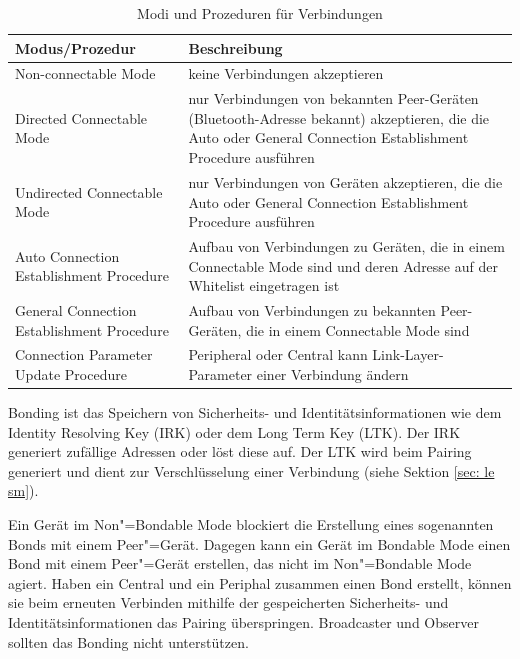 \begin{table}
    \begin{tabularx}{\textwidth}{|p{4.5cm}|X|}
    \hline
    \textbf{Modus/Prozedur} & \textbf{Beschreibung} \\
    \hline
    Non-connectable Mode & keine Verbindungen akzeptieren \\
    \hline
    Directed Connectable Mode & nur Verbindungen von bekannten Peer-Geräten (Bluetooth-Adresse bekannt) akzeptieren, die die Auto oder General Connection Establishment Procedure ausführen \\
    \hline
    Undirected Connectable Mode & nur Verbindungen von Geräten akzeptieren, die die Auto oder General Connection Establishment Procedure ausführen \\
    \hline
    Auto Connection Establishment Procedure & Aufbau von Verbindungen zu Geräten, die in einem Connectable Mode sind und deren Adresse auf der Whitelist eingetragen ist \\
    \hline
    General Connection Establishment Procedure & Aufbau von Verbindungen zu bekannten Peer-Geräten, die in einem Connectable Mode sind \\
    \hline
    Connection Parameter Update Procedure & Peripheral oder Central kann Link-Layer-Parameter einer Verbindung ändern \\
    \hline
    \end{tabularx}
    \caption[Modi und Prozeduren für Verbindungen (GAP)]{Modi und Prozeduren für Verbindungen \cite{BtSpec4.0_1704-1718}}
    \label{tab: modi prodzeduren gap}
\end{table}

Bonding ist das Speichern von Sicherheits- und Identitätsinformationen wie dem Identity Resolving Key (IRK) oder dem Long Term Key (LTK). Der IRK generiert zufällige Adressen oder löst diese auf. Der LTK wird beim Pairing generiert und dient zur Verschlüsselung einer Verbindung (siehe Sektion \ref{sec: le sm}).

Ein Gerät im Non"=Bondable Mode blockiert die Erstellung eines sogenannten Bonds mit einem Peer"=Gerät. Dagegen kann ein Gerät im Bondable Mode einen Bond mit einem Peer"=Gerät erstellen, das nicht im Non"=Bondable Mode agiert. Haben ein Central und ein Periphal zusammen einen Bond erstellt, können sie beim erneuten Verbinden mithilfe der gespeicherten Sicherheits- und Identitätsinformationen das Pairing überspringen. Broadcaster und Observer sollten das Bonding nicht unterstützen. \cite{BtSpec4.2_2060-2062}

